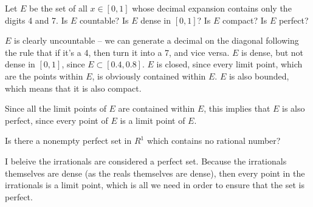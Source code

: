 \documentclass[10pt]{article}
\begin{document}
	\begin{problem}
		Let \( E \) be the set of all \( x \in [0, 1] \) whose decimal expansion contains only the digits 4 and 7.
		Is \( E \) countable? Is \( E \) dense in \( [0, 1] \)? Is \( E \) compact? Is \( E \) perfect?
	\end{problem}

	\begin{solution}
		\( E \) is clearly uncountable -- we can generate a decimal on the diagonal following the rule that if it's 
		a 4, then turn it into a 7, and vice versa. \( E \) is dense, but not dense 
		in \( [0, 1] \), since \( E \subset [0.4, 0.8] \). \( E \) is closed, since 
		every limit point, which are the points within \( E \), is obviously contained within \( E \). 
		\( E \) is also bounded, which means that it is also compact. 

		Since all the limit points of \( E \) are contained within \( E \), this implies that \( E \) is 
		also perfect, since every point of \( E \) is a limit point of \( E \). 
	\end{solution}

	\begin{problem}
		Is there a nonempty perfect set in \( R^{1} \) which contains no rational number?
	\end{problem}

	\begin{solution}
		I beleive the irrationals are considered a perfect set. Because the irrationals themselves are dense 
		(as the reals themselves are dense), then every point in the irrationals is a limit point, which is 
		all we need in order to ensure that the set is perfect. 
	\end{solution}
\end{document}
